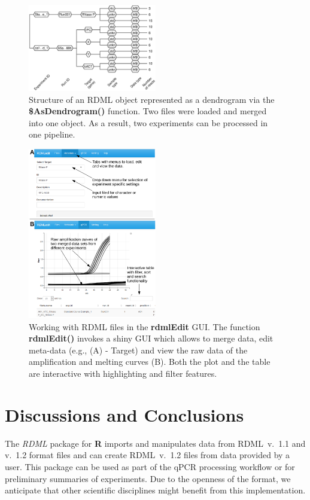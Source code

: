 \documentclass{bioinfo}
\begin{document}
\begin{figure}
\includegraphics[width=0.5\textwidth]{as_dendrogram.eps}
\caption{Structure of an RDML object represented as a dendrogram via the 
	\textbf{\$AsDendrogram()} function. Two files 
	were loaded and merged into one object. As a result, two 
	experiments can be processed in one pipeline.}\label{fig:01}
\end{figure}
\begin{figure}
\includegraphics[width=0.5\textwidth]{figure_gui.pdf}
\caption{Working with RDML files in the \textbf{rdmlEdit} GUI. 
	The function \textbf{rdmlEdit()} invokes a shiny GUI which allows to merge data, edit meta-data (e.g., (A) - Target) and view the raw 
	data of the amplification and melting curves (B). Both the plot and 
	the table are interactive with highlighting and filter features.}\label{fig:02}
\end{figure}

\section{Discussions and Conclusions}
The \textit{RDML} package for \textbf{R} imports and manipulates data 
from RDML~v.~1.1 and v.~1.2 format files and can  create RDML~v.~1.2 files 
from data provided by a user. This package can be used as  part of the qPCR 
processing workflow or for preliminary summaries of experiments. Due to the 
openness of the format, we anticipate that other scientific disciplines might 
benefit from this implementation.
\end{document}
